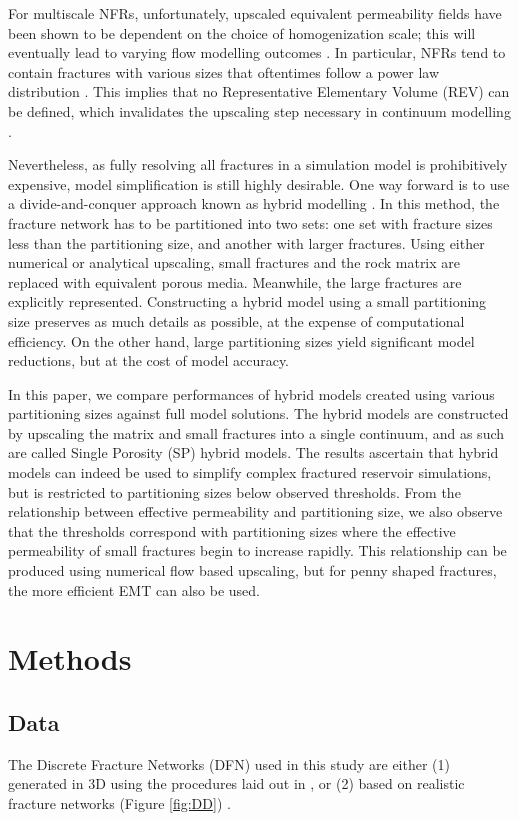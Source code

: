 \documentclass[a4paper]{article}
\begin{document}
For multiscale NFRs, unfortunately, upscaled equivalent permeability fields have been shown to be dependent on the choice of homogenization scale; this will eventually lead to varying flow modelling outcomes \citep{Elfeel2013}. In particular, NFRs tend to contain fractures with various sizes that oftentimes follow a power law distribution \citep{Bonnet2001}. This implies that no Representative Elementary Volume (REV) can be defined, which invalidates the upscaling step necessary in continuum modelling \citep{Berkowitz2002}.

Nevertheless, as fully resolving all fractures in a simulation model is prohibitively expensive, model simplification is still highly desirable. One way forward is to use a divide-and-conquer approach known as hybrid modelling \citep{Berkowitz2002, Bourbiaux2010}. In this method, the fracture network has to be partitioned into two sets: one set with fracture sizes less than the partitioning size, and another with larger fractures. Using either numerical or analytical upscaling, small fractures and the rock matrix are replaced with equivalent porous media. Meanwhile, the large fractures are explicitly represented. Constructing a hybrid model using a small partitioning size preserves as much details as possible, at the expense of computational efficiency. On the other hand, large partitioning sizes yield significant model reductions, but at the cost of model accuracy.

In this paper, we compare performances of hybrid models created using various partitioning sizes against full model solutions. The hybrid models are constructed by upscaling the matrix and small fractures into a single continuum, and as such are called Single Porosity (SP) hybrid models. The results ascertain that hybrid models can indeed be used to simplify complex fractured reservoir simulations, but is restricted to partitioning sizes below observed thresholds. From the relationship between effective permeability and partitioning size, we also observe that the thresholds correspond with partitioning sizes where the effective permeability of small fractures begin to increase rapidly. This relationship can be produced using numerical flow based upscaling, but for penny shaped fractures, the more efficient EMT can also be used.

\section{Methods}

\subsection{Data}
The Discrete Fracture Networks (DFN) used in this study are either (1) generated in 3D using the procedures laid out in \citet{Priest1993}, or (2) based on realistic fracture networks (Figure \ref{fig:DD}) \citep{Bisdom2017}.
\end{document}

